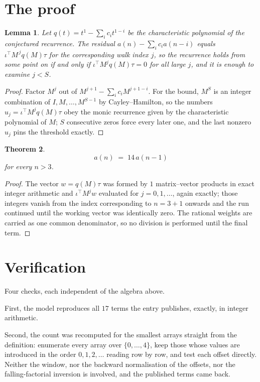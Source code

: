\documentclass[11pt,a4paper]{article}
\theoremstyle{plain}
\newtheorem{theorem}{Theorem}
\newtheorem{lemma}[theorem]{Lemma}
\theoremstyle{definition}
\begin{document}
\section{The proof}

\begin{lemma}\label{lem:crit}
Let $q(t)=t^{1}-\sum_i c_it^{1-i}$ be the characteristic polynomial of the
conjectured recurrence. The residual $a(n)-\sum_ic_ia(n-i)$ equals
$\iota^{\!\top}M^{\,j}q(M)\tau$ for the corresponding walk index $j$, so the recurrence
holds from some point on if and only if $\iota^{\!\top}M^{j}q(M)\tau=0$ for all large $j$,
and it is enough to examine $j<S$.
\end{lemma}

\begin{proof}
Factor $M^{j}$ out of $M^{j+1}-\sum_ic_iM^{j+1-i}$. For the bound, $M^{S}$
is an integer combination of $I,M,\dots,M^{S-1}$ by Cayley--Hamilton, so the numbers
$u_j=\iota^{\!\top}M^{j}q(M)\tau$ obey the monic recurrence given by the characteristic
polynomial of $M$; $S$ consecutive zeros force every later one, and the last nonzero $u_j$
pins the threshold exactly.
\end{proof}

\begin{theorem}
\[
a(n)\;=\;14\,a(n-1)
\]
for every $n>3$.
\end{theorem}

\begin{proof}
The vector $w=q(M)\tau$ was formed by $1$ matrix--vector products in exact integer
arithmetic and $\iota^{\!\top}M^{j}w$ evaluated for $j=0,1,\dots$, again exactly; those
integers vanish from the index corresponding to $n=3+1$ onwards and the run continued
until the working vector was identically zero. The rational weights are carried as one common
denominator, so no division is performed until the final term.
\end{proof}

\section{Verification}

Four checks, each independent of the algebra above.

First, the model reproduces all $17$ terms the entry publishes, exactly, in integer
arithmetic.

Second, the count was recomputed for the smallest arrays straight from the definition:
enumerate every array over $\{0,\dots,4\}$, keep those whose values are introduced in the
order $0,1,2,\dots$ reading row by row, and test each offset directly. Neither the window, nor
the backward normalisation of the offsets, nor the falling-factorial inversion is involved, and
the published terms came back.
\end{document}
